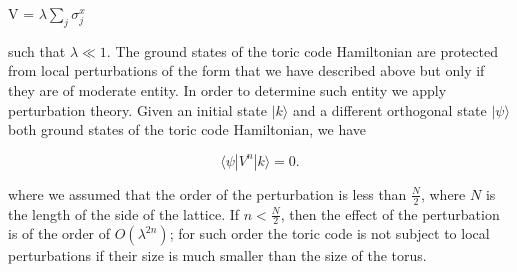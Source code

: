 \documentclass{Configuration_Files/PoliMi3i_thesis}
\begin{document}
\begin{center}
	V = $\lambda \sum_{j} \sigma^x_j $
\end{center}

such that $\lambda \ll 1 $\cite{Kit02}. The ground states of the toric code Hamiltonian are protected from local perturbations of the form that we have described above but only if they are of moderate entity. In order to determine such entity we apply perturbation theory. Given an initial state $|k \rangle $ and a different orthogonal state $ |\psi \rangle $ both ground states of the toric code Hamiltonian, we have

\begin{equation}
	 \langle \psi |V^n| k \rangle=0.                                    
\end{equation}



where we assumed that the order of the perturbation is less than $ \frac{N}{2}$, where $N$ is the length of the side of the lattice. 
If $n < \frac{N}{2}$, then the effect of the perturbation is of the order of $O(\lambda^{2n})$; for such order the toric code is not subject to local perturbations if their size is much smaller than the size of the torus.
\end{document}

